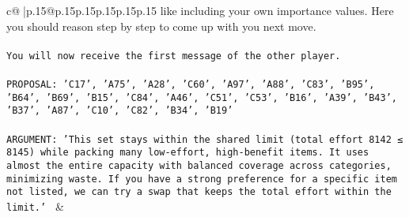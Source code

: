 \documentclass{article}
\begin{document}
{\begin{supertabular}{c@{$\;$}|p{.15\linewidth}@{}p{.15\linewidth}p{.15\linewidth}p{.15\linewidth}p{.15\linewidth}p{.15\linewidth}}
{{{like including your own importance values. Here you should reason step by step to come up with you next move.\\ \tt \\ \tt You will now receive the first message of the other player.\\ \tt \\ \tt PROPOSAL: {'C17', 'A75', 'A28', 'C60', 'A97', 'A88', 'C83', 'B95', 'B64', 'B69', 'B15', 'C84', 'A46', 'C51', 'C53', 'B16', 'A39', 'B43', 'B37', 'A87', 'C10', 'C82', 'B34', 'B19'}\\ \tt \\ \tt ARGUMENT: {'This set stays within the shared limit (total effort 8142 ≤ 8145) while packing many low-effort, high-benefit items. It uses almost the entire capacity with balanced coverage across categories, minimizing waste. If you have a strong preference for a specific item not listed, we can try a swap that keeps the total effort within the limit.'} 
	  } 
	   } 
	   } 
	 & \\ 
 

    \theutterance {}  


\end{supertabular}}
\end{document}
